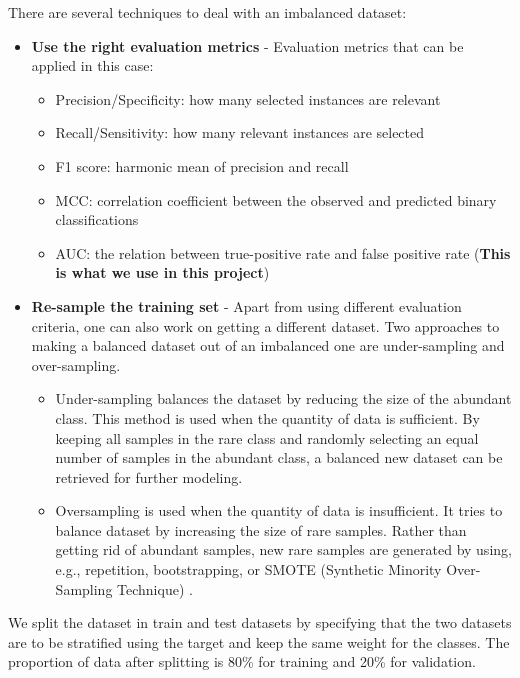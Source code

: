 There are several techniques to deal with an imbalanced dataset:
\begin{itemize}
    \item \textbf{Use the right evaluation metrics} - Evaluation metrics that can be applied in this case:
        \begin{itemize}
            \item Precision/Specificity: how many selected instances are relevant
            \item Recall/Sensitivity: how many relevant instances are selected
            \item F1 score: harmonic mean of precision and recall
            \item MCC: correlation coefficient between the observed and predicted binary classifications
            \item AUC: the relation between true-positive rate and false positive rate (\textbf{This is what we use in this project})
        \end{itemize}
    \item \textbf{Re-sample the training set} - Apart from using different evaluation criteria, one can also work on getting a different dataset. Two approaches to making a balanced dataset out of an imbalanced one are under-sampling and over-sampling.
        \begin{itemize}
            \item Under-sampling balances the dataset by reducing the size of the abundant class. This method is used when the quantity of data is sufficient. By keeping all samples in the rare class and randomly selecting an equal number of samples in the abundant class, a balanced new dataset can be retrieved for further modeling.
            \item Oversampling is used when the quantity of data is insufficient. It tries to balance dataset by increasing the size of rare samples. Rather than getting rid of abundant samples, new rare samples are generated by using, e.g., repetition, bootstrapping, or SMOTE (Synthetic Minority Over-Sampling Technique) \cite{SMOTE}.
        \end{itemize}
\end{itemize}

We split the dataset in train and test datasets by specifying that the two datasets are to be stratified using the target and keep the same weight for the classes. The proportion of data after splitting is 80\% for training and 20\% for validation.

